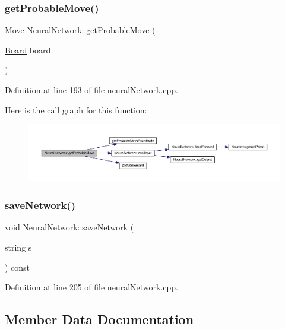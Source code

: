 \subsubsection{\texorpdfstring{get\+Probable\+Move()}{getProbableMove()}}
{\footnotesize\ttfamily \hyperlink{struct_move}{Move} Neural\+Network\+::get\+Probable\+Move (\begin{DoxyParamCaption}\item[{\hyperlink{constants_8h_af901d0acc1572fb0c779f84ddd2c6ce8}{Board}}]{board }\end{DoxyParamCaption})}



Definition at line 193 of file neural\+Network.\+cpp.

Here is the call graph for this function\+:\nopagebreak
\begin{figure}[H]
\begin{center}
\leavevmode
\includegraphics[width=350pt]{class_neural_network_abaeb2ec4b31b2a69985cacec5fd1d685_cgraph}
\end{center}
\end{figure}
\mbox{\label{class_neural_network_adf3230528dd4c37960464557c690cbae}} 
\subsubsection{\texorpdfstring{save\+Network()}{saveNetwork()}}
{\footnotesize\ttfamily void Neural\+Network\+::save\+Network (\begin{DoxyParamCaption}\item[{string}]{s }\end{DoxyParamCaption}) const}



Definition at line 205 of file neural\+Network.\+cpp.



\subsection{Member Data Documentation}
\mbox{\label{class_neural_network_a34c4927691004c6a9a637e82f9351d28}} 
